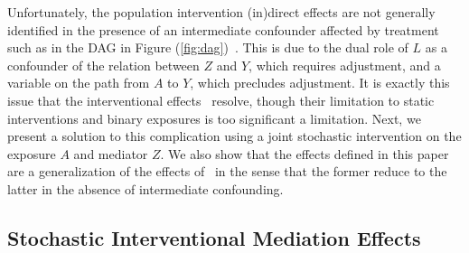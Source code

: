 Unfortunately, the population intervention (in)direct effects are not generally
identified in the presence of an intermediate confounder affected by treatment
such as in the DAG in Figure (\ref{fig:dag})~\citep{diaz2020causal}. This is due
to the dual role of $L$ as a confounder of the relation between $Z$ and $Y$,
which requires adjustment, and a variable on the path from $A$ to $Y$, which
precludes adjustment. It is exactly this issue that the interventional
effects~\citep{vanderweele2014effect} resolve, though their limitation to static
interventions and binary exposures is too significant a limitation. Next, we
present a solution to this complication using a joint stochastic intervention on
the exposure $A$ and mediator $Z$. We also show that the effects defined in this
paper are a generalization of the effects of~\cite{diaz2020causal} in the sense
that the former reduce to the latter in the absence of intermediate confounding.

\subsection{Stochastic Interventional Mediation Effects}

